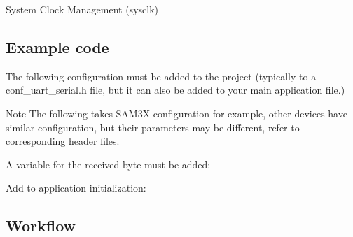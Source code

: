 \begin{DoxyEnumerate}
\item System Clock Management (sysclk)
\end{DoxyEnumerate}\hypertarget{serial_quickstart_serial_basic_use_case_setup_code}{}\subsection{Example code}\label{serial_quickstart_serial_basic_use_case_setup_code}
The following configuration must be added to the project (typically to a conf\+\_\+uart\+\_\+serial.\+h file, but it can also be added to your main application file.)

\begin{DoxyNote}{Note}
The following takes S\+A\+M3X configuration for example, other devices have similar configuration, but their parameters may be different, refer to corresponding header files.
\end{DoxyNote}

\begin{DoxyCode}{0}
\DoxyCodeLine{\textcolor{preprocessor}{\#define USART\_SERIAL                     \&USARTD0}}
\DoxyCodeLine{\textcolor{preprocessor}{\#define USART\_SERIAL\_BAUDRATE            9600}}
\DoxyCodeLine{\textcolor{preprocessor}{\#define USART\_SERIAL\_CHAR\_LENGTH         US\_MR\_CHRL\_8\_BIT}}
\DoxyCodeLine{\textcolor{preprocessor}{\#define USART\_SERIAL\_PARITY              US\_MR\_PAR\_NO}}
\DoxyCodeLine{\textcolor{preprocessor}{\#define USART\_SERIAL\_STOP\_BIT            false}}
\end{DoxyCode}


A variable for the received byte must be added\+: 
\begin{DoxyCode}{0}
\end{DoxyCode}


Add to application initialization\+: 
\begin{DoxyCode}{0}
\DoxyCodeLine{}
\DoxyCodeLine{\};}
\DoxyCodeLine{}
\end{DoxyCode}
\hypertarget{serial_quickstart_serial_basic_use_case_setup_flow}{}\subsection{Workflow}\label{serial_quickstart_serial_basic_use_case_setup_flow}

